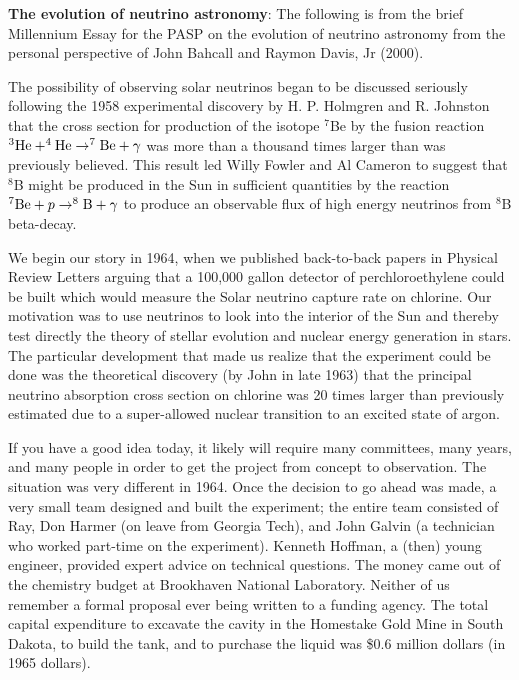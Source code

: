 \documentclass[a4paper,10pt]{article}
\begin{document}
{\noindent}\textbf{The evolution of neutrino astronomy}: The following is from the brief Millennium Essay for the PASP on the evolution of neutrino astronomy from the personal perspective of John Bahcall and Raymon Davis, Jr (2000).

{\noindent}The possibility of observing solar neutrinos began to be discussed seriously following the 1958 experimental discovery by H. P. Holmgren and R. Johnston that the cross section for production of the isotope $^7$Be by the fusion reaction $^3{\rm He}+^4{\rm He}\rightarrow^7{\rm Be}+\gamma$ was more than a thousand times larger than was previously believed. This result led Willy Fowler and Al Cameron to suggest that $^8$B might be produced in the Sun in sufficient quantities by the reaction $^7{\rm Be}+p\rightarrow^8{\rm B}+\gamma$ to produce an observable flux of high energy neutrinos from $^8$B beta-decay.

{\noindent}We begin our story in 1964, when we published back-to-back papers in Physical Review Letters arguing that a 100,000 gallon detector of perchloroethylene could be built which would measure the Solar neutrino capture rate on chlorine. Our motivation was to use neutrinos to look into the interior of the Sun and thereby test directly the theory of stellar evolution and nuclear energy generation in stars. The particular development that made us realize that the experiment could be done was the theoretical discovery (by John in late 1963) that the principal neutrino absorption cross section on chlorine was 20 times larger than previously estimated due to a super-allowed nuclear transition to an excited state of argon.

{\noindent}If you have a good idea today, it likely will require many committees, many years, and many people in order to get the project from concept to observation. The situation was very different in 1964. Once the decision to go ahead was made, a very small team designed and built the experiment; the entire team consisted of Ray, Don Harmer (on leave from Georgia Tech), and John Galvin (a technician who worked part-time on the experiment). Kenneth Hoffman, a (then) young engineer, provided expert advice on technical questions. The money came out of the chemistry budget at Brookhaven National Laboratory. Neither of us remember a formal proposal ever being written to a funding agency. The total capital expenditure to excavate the cavity in the Homestake Gold Mine in South Dakota, to build the tank, and to purchase the liquid was \$0.6 million dollars (in 1965 dollars).
\end{document}
